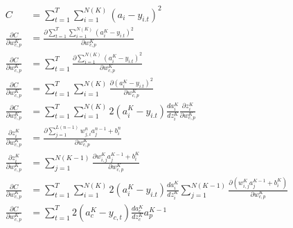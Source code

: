 \documentclass[11pt]{article}
\begin{document}
\begin{align}
C &= \sum_{t=1}^{T} \sum_{i=1}^{N(K)}(a_{i} - y_{i. t})^{2}
\\
\frac{\partial C}{\partial w_{c, p}^{K}} &= \frac{\partial\sum_{t=1}^{T} \sum_{i=1}^{N(K)}(a_{i}^{K} - y_{i. t})^{2}}{\partial w_{c, p}^{K}}
\\
\frac{\partial C}{\partial w_{c, p}^{K}} &= \sum_{t=1}^{T} \frac{\partial \sum_{i=1}^{N(K)}(a_{i}^{K} - y_{i. t})^{2}}{\partial w_{c, p}^{K}}
\\
\frac{\partial C}{\partial w_{c, p}^{K}} &= \sum_{t=1}^{T} \sum_{i=1}^{N(K)} \frac{\partial (a_{i}^{K} - y_{i. t})^{2}}{\partial w_{c, p}^{K}}
\\
\frac{\partial C}{\partial w_{c, p}^{K}} &= \sum_{t=1}^{T} \sum_{i=1}^{N(K)} 2(a_{i}^{K} - y_{i. t}) \frac{d a_{i}^{K}}{d z_{i}^{K}}\frac{\partial z_{i}^{K}}{\partial w_{c, p}^{K}}
\\
\frac{\partial z_{i}^{K}}{\partial w_{c, p}^{K}} &= \frac{\partial \sum_{j=1}^{L(n-1)} w_{j,i}^{n}a_{j}^{n-1} + b_{i}^{n}}{\partial w_{c, p}^{K}}
\\
\frac{\partial z_{i}^{K}}{\partial w_{c, p}^{K}} &= \sum_{j=1}^{N(K-1)} \frac{\partial w_{i,j}^{K}a_{j}^{K-1} + b_{i}^{K}}{\partial w_{c, p}^{K}}
\\
\frac{\partial C}{\partial w_{c, p}^{K}} &= \sum_{t=1}^{T} \sum_{i=1}^{N(K)} 2(a_{i}^{K} - y_{i. t}) \frac{d a_{i}^{K}}{d z_{i}^{K}}\sum_{j=1}^{N(K-1)} \frac{\partial (w_{i,j}^{K}a_{j}^{K-1} + b_{i}^{K})}{\partial w_{c, p}^{K}}
\\
\frac{\partial C}{\partial w_{c, p}^{K}} &= \sum_{t=1}^{T} 2(a_{c}^{K} - y_{c, t}) \frac{d a_{c}^{K}}{d z_{c}^{K}}a_{p}^{K-1}
\end{align}
\end{document}

